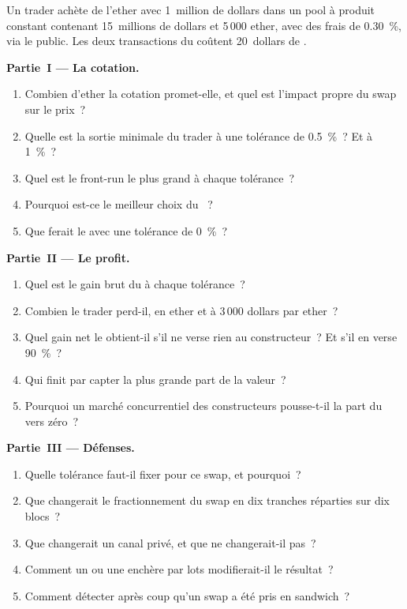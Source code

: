 \begin{problem}\label{pb:m3:maximal-extractable-value:1}
Un trader achète de l'ether avec 1~million de dollars dans un pool à produit constant contenant 15~millions de dollars et 5\,000 ether, avec des frais de 0.30~\%, via le
 public. Les deux transactions du  coûtent 20~dollars de .

\medskip\noindent\textbf{Partie~I --- La cotation.}
\begin{enumerate}
\item Combien d'ether la cotation promet-elle, et quel est l'impact propre du swap sur le prix~?
\item Quelle est la sortie minimale du trader à une tolérance de 0.5~\%~? Et à 1~\%~?
\item Quel est le front-run le plus grand à chaque tolérance~?
\item Pourquoi est-ce le meilleur choix du ~?
\item Que ferait le  avec une tolérance de 0~\%~?
\end{enumerate}

\medskip\noindent\textbf{Partie~II --- Le profit.}
\begin{enumerate}[resume]
\item Quel est le gain brut du  à chaque tolérance~?
\item Combien le trader perd-il, en ether et à 3\,000 dollars par ether~?
\item Quel gain net le  obtient-il s'il ne verse rien au constructeur~? Et s'il en verse 90~\%~?
\item Qui finit par capter la plus grande part de la valeur~?
\item Pourquoi un marché concurrentiel des constructeurs pousse-t-il la part du  vers zéro~?
\end{enumerate}

\medskip\noindent\textbf{Partie~III --- Défenses.}
\begin{enumerate}[resume]
\item Quelle tolérance faut-il fixer pour ce swap, et pourquoi~?
\item Que changerait le fractionnement du swap en dix tranches réparties sur dix blocs~?
\item Que changerait un canal privé, et que ne changerait-il pas~?
\item Comment un  ou une enchère par lots modifierait-il le résultat~?
\item Comment détecter après coup qu'un swap a été pris en sandwich~?
\end{enumerate}


\end{problem}
